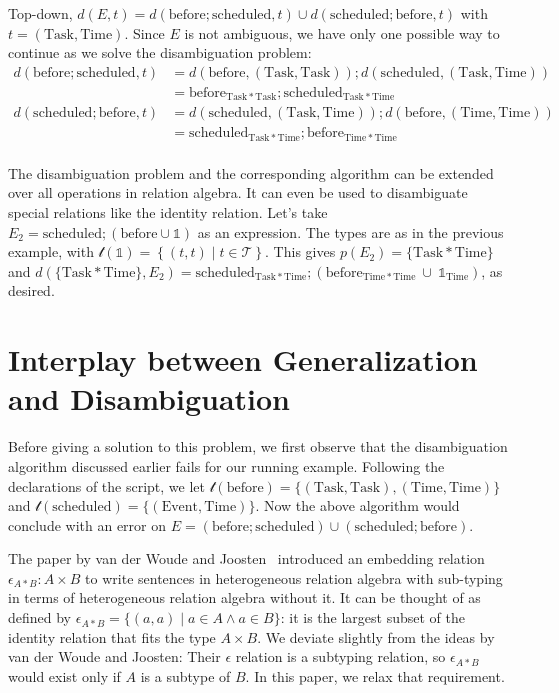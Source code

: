 \documentclass[12pt]{article}
\begin{document}
Top-down, $d(E,t) = d(\mathrm{before};\mathrm{scheduled},t) \cup d(\mathrm{scheduled};\mathrm{before},t)$ with $t=(\mathrm{Task}, \mathrm{Time})$.
Since $E$ is not ambiguous, we have only one possible way to continue as we solve the disambiguation problem:
\begin{align*}d(\mathrm{before};\mathrm{scheduled},t) &= d(\mathrm{before},(\mathrm{Task}, \mathrm{Task})) ;  d(\mathrm{scheduled},(\mathrm{Task}, \mathrm{Time})) \\
&=\mathrm{before}_{\mathrm{Task} * \mathrm{Task}}; \mathrm{scheduled}_{\mathrm{Task}* \mathrm{Time}}\\
d(\mathrm{scheduled};\mathrm{before},t) &=  d(\mathrm{scheduled},(\mathrm{Task}, \mathrm{Time}));d(\mathrm{before},(\mathrm{Time}, \mathrm{Time}))\\
&=\mathrm{scheduled}_{\mathrm{Task} * \mathrm{Time}}; \mathrm{before}_{\mathrm{Time}* \mathrm{Time}}\\
\end{align*}

The disambiguation problem and the corresponding algorithm can be extended over all operations in relation algebra.
It can even be used to disambiguate special relations like the identity relation.
Let's take $E_2 = \mathrm{scheduled};(\mathrm{before} \cup \mathbb{1})$ as an expression.
The types are as in the previous example, with $\mathcal{t}(\mathbb{1}) = \left\{(t,t)\mid t\in \mathcal{T}\right\}$.
This gives $p(E_2) = \{\mathrm{Task} * \mathrm{Time}\}$ and $d(\{\mathrm{Task} * \mathrm{Time}\},E_2) = \mathrm{scheduled}_{\mathrm{Task} * \mathrm{Time}};(\mathrm{before}_{\mathrm{Time} * \mathrm{Time}}\ \cup\ \mathbb{1}_{\mathrm{Time}})$, as desired.

\section{Interplay between Generalization and Disambiguation}
Before giving a solution to this problem, we first observe that the disambiguation algorithm discussed earlier fails for our running example.
Following the declarations of the script, we let $\mathcal{t}(\mathrm{before}) = \{(\mathrm{Task}, \mathrm{Task}),(\mathrm{Time}, \mathrm{Time})\}$ and $\mathcal{t}(\mathrm{scheduled}) = \{(\mathrm{Event}, \mathrm{Time})\}$.
Now the above algorithm would conclude with an error on $E = (\mathrm{before};\mathrm{scheduled}) \cup (\mathrm{scheduled};\mathrm{before})$.

The paper by van der Woude and Joosten~\cite{Woude11} introduced an embedding relation $\epsilon_{A*B} : A \times B$ to write sentences in heterogeneous relation algebra with sub-typing in terms of heterogeneous relation algebra without it.
It can be thought of as defined by $\epsilon_{A*B} = \{(a,a) \mid a\in A \wedge a\in B\}$: it is the largest subset of the identity relation that fits the type $A\times B$.
We deviate slightly from the ideas by van der Woude and Joosten: Their $\epsilon$ relation is a subtyping relation, so $\epsilon_{A*B}$ would exist only if $A$ is a subtype of $B$.
In this paper, we relax that requirement.
\end{document}
